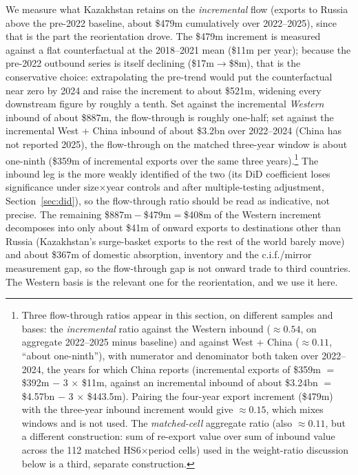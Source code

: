 \documentclass[12pt]{article}
\begin{document}
We measure what Kazakhstan retains on the \emph{incremental} flow (exports to Russia above
the pre-2022 baseline, about \$479m cumulatively over 2022--2025), since that is the part the
reorientation drove. The \$479m increment is measured against a flat counterfactual at the
2018--2021 mean (\$11m per year); because the pre-2022 outbound series is itself declining
(\$17m$\to$\$8m), that is the conservative choice: extrapolating the pre-trend would put the
counterfactual near zero by 2024 and raise the increment to about \$521m, widening every
downstream figure by roughly a tenth. Set against the incremental \emph{Western} inbound of
about \$887m, the flow-through is roughly one-half; set against the incremental West + China
inbound of about \$3.2bn over 2022--2024 (China has not reported 2025), the flow-through on the matched three-year window is about one-ninth (\$359m of incremental exports over the same three years).\footnote{Three flow-through ratios appear in this
section, on different samples and bases: the \emph{incremental} ratio against the Western
inbound ($\approx 0.54$, on aggregate 2022--2025 minus baseline) and against West + China
($\approx 0.11$, ``about one-ninth''), with numerator and denominator both taken over 2022--2024, the years for which China reports (incremental exports of \$359m $=$ \$392m $-$ 3 $\times$ \$11m, against an incremental inbound of about \$3.24bn $=$ \$4.57bn $-$ 3 $\times$ \$443.5m). Pairing the four-year export increment (\$479m) with the three-year inbound increment would give $\approx 0.15$, which mixes windows and is not used. The \emph{matched-cell} aggregate ratio (also $\approx 0.11$, but a different construction: sum of re-export value over sum of inbound value across the 112 matched
HS6$\times$period cells) used in the weight-ratio discussion below is a third, separate
construction.} The inbound leg is the more weakly identified of
the two (its DiD coefficient loses significance under size$\times$year controls and after
multiple-testing adjustment, Section~\ref{sec:did}), so the flow-through ratio should be read
as indicative, not precise. The remaining \$887m${}-{}$\$479m${}={}$\$408m of
the Western increment decomposes into only about \$41m of onward exports to destinations other
than Russia (Kazakhstan's surge-basket exports to the rest of the world barely move) and about
\$367m of domestic absorption, inventory and the c.i.f./mirror measurement gap, so the flow-through gap is not onward trade to third countries. The Western basis is the
relevant one for the reorientation, and we use it here.
\end{document}
